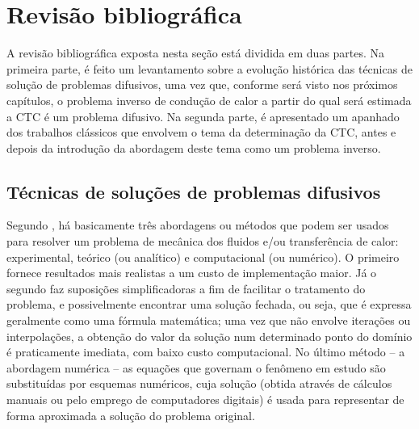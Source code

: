 \section{Revisão bibliográfica}

A revisão bibliográfica exposta nesta seção está dividida em duas partes. Na primeira parte, é feito um levantamento sobre a evolução histórica
das técnicas de solução de problemas difusivos, uma vez que, conforme será visto nos próximos capítulos, o problema inverso de condução de calor
a partir do qual será estimada a CTC é um problema difusivo. Na segunda parte, é apresentado um apanhado dos trabalhos clássicos que envolvem o tema da
determinação da CTC, antes e depois da introdução da abordagem deste tema como um problema inverso.

\subsection{Técnicas de soluções de problemas difusivos}

Segundo \cite{livro_tanehill}, há basicamente três abordagens ou métodos que podem ser usados para resolver um problema
de mecânica dos fluidos e/ou transferência de calor: experimental, teórico (ou analítico) e computacional (ou numérico). O primeiro
fornece resultados mais realistas a um custo de implementação maior. Já o segundo faz suposições
simplificadoras a fim de facilitar o tratamento do problema, e possivelmente encontrar uma solução fechada, ou seja, que é expressa geralmente como uma fórmula
matemática; uma vez que não envolve iterações ou interpolações, a obtenção do valor da solução num determinado ponto do domínio é praticamente imediata,
com baixo custo computacional. No último método -- a abordagem numérica -- as equações que governam o fenômeno em estudo são substituídas por
esquemas numéricos, cuja solução (obtida através de cálculos manuais ou pelo emprego de computadores digitais) é usada para representar de forma
aproximada a solução do problema original.

